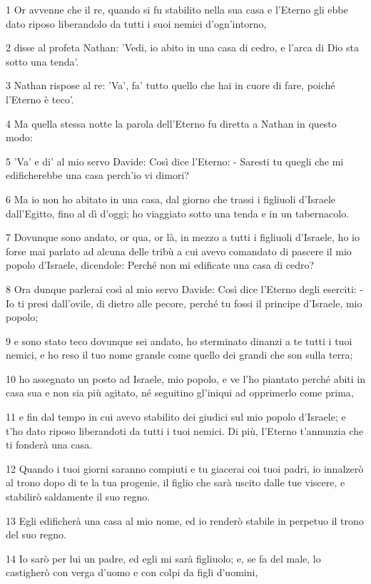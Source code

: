 \par 1 Or avvenne che il re, quando si fu stabilito nella sua casa e l'Eterno gli ebbe dato riposo liberandolo da tutti i suoi nemici d'ogn'intorno,
\par 2 disse al profeta Nathan: 'Vedi, io abito in una casa di cedro, e l'arca di Dio sta sotto una tenda'.
\par 3 Nathan rispose al re: 'Va', fa' tutto quello che hai in cuore di fare, poiché l'Eterno è teco'.
\par 4 Ma quella stessa notte la parola dell'Eterno fu diretta a Nathan in questo modo:
\par 5 'Va' e di' al mio servo Davide: Così dice l'Eterno: - Saresti tu quegli che mi edificherebbe una casa perch'io vi dimori?
\par 6 Ma io non ho abitato in una casa, dal giorno che trassi i figliuoli d'Israele dall'Egitto, fino al dì d'oggi; ho viaggiato sotto una tenda e in un tabernacolo.
\par 7 Dovunque sono andato, or qua, or là, in mezzo a tutti i figliuoli d'Israele, ho io forse mai parlato ad alcuna delle tribù a cui avevo comandato di pascere il mio popolo d'Israele, dicendole: Perché non mi edificate una casa di cedro?
\par 8 Ora dunque parlerai così al mio servo Davide: Così dice l'Eterno degli eserciti: - Io ti presi dall'ovile, di dietro alle pecore, perché tu fossi il principe d'Israele, mio popolo;
\par 9 e sono stato teco dovunque sei andato, ho sterminato dinanzi a te tutti i tuoi nemici, e ho reso il tuo nome grande come quello dei grandi che son sulla terra;
\par 10 ho assegnato un posto ad Israele, mio popolo, e ve l'ho piantato perché abiti in casa sua e non sia più agitato, né seguitino gl'iniqui ad opprimerlo come prima,
\par 11 e fin dal tempo in cui avevo stabilito dei giudici sul mio popolo d'Israele; e t'ho dato riposo liberandoti da tutti i tuoi nemici. Di più, l'Eterno t'annunzia che ti fonderà una casa.
\par 12 Quando i tuoi giorni saranno compiuti e tu giacerai coi tuoi padri, io innalzerò al trono dopo di te la tua progenie, il figlio che sarà uscito dalle tue viscere, e stabilirò saldamente il suo regno.
\par 13 Egli edificherà una casa al mio nome, ed io renderò stabile in perpetuo il trono del suo regno.
\par 14 Io sarò per lui un padre, ed egli mi sarà figliuolo; e, se fa del male, lo castigherò con verga d'uomo e con colpi da figli d'uomini,
